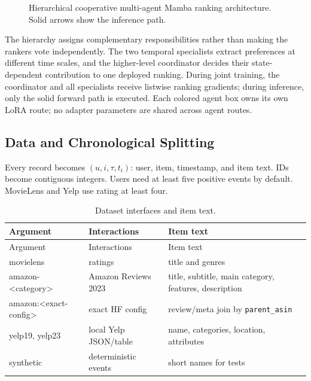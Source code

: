\documentclass[11pt,a4paper]{article}
\begin{document}
\begin{figure}[H]
{}
\caption{Hierarchical cooperative multi-agent Mamba ranking architecture.
Solid arrows show the inference path.}
\label{fig:pipeline}
\end{figure}

The hierarchy assigns complementary responsibilities rather than making the
rankers vote independently. The two temporal specialists extract preferences at
different time scales, and the higher-level coordinator decides their
state-dependent contribution to one deployed ranking. During joint training,
the coordinator and all specialists receive listwise ranking gradients; during
inference, only the solid forward path is executed. Each colored agent box owns
its own LoRA route; no adapter parameters are shared across agent routes.

\subsection{Data and Chronological Splitting}

Every record becomes $(u,i,\tau,t_i)$: user, item, timestamp, and item text. IDs become contiguous integers. Users need at least five positive events by default. MovieLens and Yelp use rating at least four.

\begin{longtable}{p{}p{}p{}}
\caption{Dataset interfaces and item text.}\label{tab:data}\\
\toprule
Argument & Interactions & Item text\\
\midrule
\endfirsthead
\toprule
Argument & Interactions & Item text\\
\midrule
\endhead
movielens & ratings & title and genres\\
amazon-\textless category\textgreater & Amazon Reviews 2023 & title, subtitle, main category, features, description\\
amazon:\textless exact-config\textgreater & exact HF config & review/meta join by \texttt{parent\_asin}\\
yelp19, yelp23 & local Yelp JSON/table & name, categories, location, attributes\\
synthetic & deterministic events & short names for tests\\
\bottomrule
\end{longtable}
\end{document}
